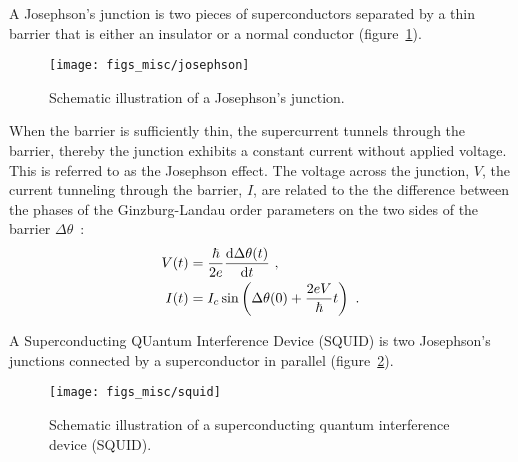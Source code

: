 A Josephson's junction is two pieces of superconductors separated by a thin barrier that is either an insulator or a normal conductor (figure~\ref{fig:josephson}). %
\begin{figure}[ht]%
	\centering%
    \texttt{[image: figs\_misc/josephson]}%
    \caption[Josephson's junction]{\label{fig:josephson}Schematic illustration of a Josephson's junction.}%
\end{figure}%
%
When the barrier is sufficiently thin, the supercurrent tunnels through the barrier, thereby the junction exhibits a constant current without applied voltage. This is referred to as the Josephson effect. The voltage across the junction, $V$, the current tunneling through the barrier, $I$, are related to the the difference between the phases of the Ginzburg-Landau order parameters on the two sides of the barrier $\Delta\theta$~\cite{Josephson1962, Josephson1974}:%
\begin{align}
    V(t) &= \frac{\hbar}{2e}\frac{\mathop{}\!\mathrm{d} \Delta\theta(t)}{\mathop{}\!\mathrm{d} t}~,\\
    I(t) &= I_c\sin\left(\Delta\theta(0) + \frac{2eV}{\hbar}t\right)~.
\end{align}

A Superconducting QUantum Interference Device (SQUID) is two Josephson's junctions connected by a superconductor in parallel (figure~\ref{fig:squid}). %
\begin{figure}[ht]%
	\centering%
    \texttt{[image: figs\_misc/squid]}%
    \caption[Superconducting quantum interference device]{\label{fig:squid}Schematic illustration of a superconducting quantum interference device (SQUID).}%
\end{figure}%